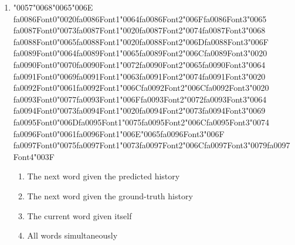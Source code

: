 \documentclass[12pt]{article}
\begin{document}
\begin{enumerate}[label=Q\arabic*.]
\item {\char"0057}{\char"0068}{\char"0065}{\char"006E} {\csname fa0086Font0\endcsname\char"0020}{\csname fa0086Font1\endcsname\char"0064}{\csname fa0086Font2\endcsname\char"006F}{\csname fa0086Font3\endcsname\char"0065} {\csname fa0087Font0\endcsname\char"0073}{\csname fa0087Font1\endcsname\char"0020}{\csname fa0087Font2\endcsname\char"0074}{\csname fa0087Font3\endcsname\char"0068} {\csname fa0088Font0\endcsname\char"0065}{\csname fa0088Font1\endcsname\char"0020}{\csname fa0088Font2\endcsname\char"006D}{\csname fa0088Font3\endcsname\char"006F} {\csname fa0089Font0\endcsname\char"0064}{\csname fa0089Font1\endcsname\char"0065}{\csname fa0089Font2\endcsname\char"006C}{\csname fa0089Font3\endcsname\char"0020} {\csname fa0090Font0\endcsname\char"0070}{\csname fa0090Font1\endcsname\char"0072}{\csname fa0090Font2\endcsname\char"0065}{\csname fa0090Font3\endcsname\char"0064} {\csname fa0091Font0\endcsname\char"0069}{\csname fa0091Font1\endcsname\char"0063}{\csname fa0091Font2\endcsname\char"0074}{\csname fa0091Font3\endcsname\char"0020} {\csname fa0092Font0\endcsname\char"0061}{\csname fa0092Font1\endcsname\char"006C}{\csname fa0092Font2\endcsname\char"006C}{\csname fa0092Font3\endcsname\char"0020} {\csname fa0093Font0\endcsname\char"0077}{\csname fa0093Font1\endcsname\char"006F}{\csname fa0093Font2\endcsname\char"0072}{\csname fa0093Font3\endcsname\char"0064} {\csname fa0094Font0\endcsname\char"0073}{\csname fa0094Font1\endcsname\char"0020}{\csname fa0094Font2\endcsname\char"0073}{\csname fa0094Font3\endcsname\char"0069} {\csname fa0095Font0\endcsname\char"006D}{\csname fa0095Font1\endcsname\char"0075}{\csname fa0095Font2\endcsname\char"006C}{\csname fa0095Font3\endcsname\char"0074} {\csname fa0096Font0\endcsname\char"0061}{\csname fa0096Font1\endcsname\char"006E}{\char"0065}{\csname fa0096Font3\endcsname\char"006F} {\csname fa0097Font0\endcsname\char"0075}{\csname fa0097Font1\endcsname\char"0073}{\csname fa0097Font2\endcsname\char"006C}{\csname fa0097Font3\endcsname\char"0079}{\csname fa0097Font4\endcsname\char"003F}
\begin{enumerate}[label=(\Alph*)]
    \item The next word given the predicted history
    \item The next word given the ground-truth history
    \item The current word given itself
    \item All words simultaneously
\end{enumerate}

\end{enumerate}
\end{document}
